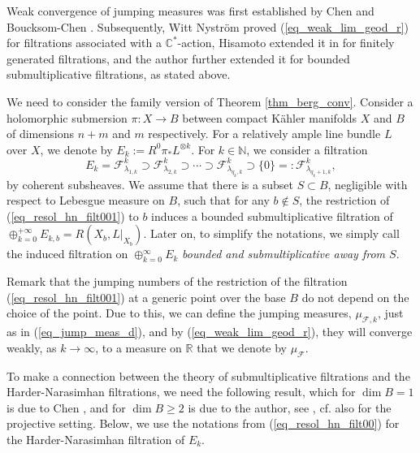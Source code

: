 \documentclass[12pt]{article}
\numberwithin{equation}{section}
\theoremstyle{theorem}
\theoremstyle{definition}
\theoremstyle{remark}
\newcommand{\real}{\mathbb{R}}
\newcommand{\nat}{\mathbb{N}}
\begin{document}
	Weak convergence of jumping measures was first established by Chen \cite{ChenHNolyg} and Boucksom-Chen \cite{BouckChen}. 
	Subsequently, Witt Nyström \cite{NystOkounTest} proved (\ref{eq_weak_lim_geod_r}) for filtrations associated with a $\mathbb{C}^*$-action, Hisamoto extended it in \cite{HisamSpecMeas} for finitely generated filtrations, and the author \cite[Theorem 5.4]{FinSecRing} further extended it for bounded submultiplicative filtrations, as stated above.
	\par 
	We need to consider the family version of Theorem \ref{thm_berg_conv}.
	Consider a holomorphic submersion $\pi : X \to B$ between compact Kähler manifolds $X$ and $B$ of dimensions $n + m$ and $m$ respectively.
	For a relatively ample line bundle $L$ over $X$, we denote by $E_k := R^0 \pi_* L^{\otimes k}$.
	For $k \in \nat$, we consider a filtration
	\begin{equation}\label{eq_resol_hn_filt001}
		E_k = \mathcal{F}^{k}_{\lambda_{1, k}} \supset \mathcal{F}^{k}_{\lambda_{2, k}} \supset \cdots \supset \mathcal{F}^{k}_{\lambda_{q_k, k}} \supset \{0\} =: \mathcal{F}^{k}_{\lambda_{q_k + 1, k}},
	\end{equation}
	by coherent subsheaves.
	We assume that there is a subset $S \subset B$, negligible with respect to Lebesgue measure on $B$, such that for any $b \notin S$, the restriction of (\ref{eq_resol_hn_filt001}) to $b$ induces a bounded submultiplicative filtration of $\oplus_{k = 0}^{+\infty} E_{k, b} = R(X_b, L|_{X_b})$.
	Later on, to simplify the notations, we simply call the induced filtration on $\oplus_{k = 0}^{\infty} E_k$ \textit{bounded and submultiplicative away from $S$}.
	\par 
	Remark that the jumping numbers of the restriction of the filtration (\ref{eq_resol_hn_filt001}) at a generic point over the base $B$ do not depend on the choice of the point.
	Due to this, we can define the jumping measures, $\mu_{\mathcal{F}, k}$, just as in (\ref{eq_jump_meas_d}), and by (\ref{eq_weak_lim_geod_r}), they will converge weakly, as $k \to \infty$, to a measure on $\real$ that we denote by $\mu_{\mathcal{F}}$. 
	\par 
	To make a connection between the theory of submultiplicative filtrations and the Harder-Narasimhan filtrations, we need the following result, which for $\dim B = 1$ is due to Chen \cite{ChenHNolyg}, and for $\dim B \geq 2$ is due to the author, see \cite{FinHNII}, cf. also \cite{FinHNI} for the projective setting. 
	Below, we use the notations from (\ref{eq_resol_hn_filt00}) for the Harder-Narasimhan filtration of $E_k$.
\end{document}
